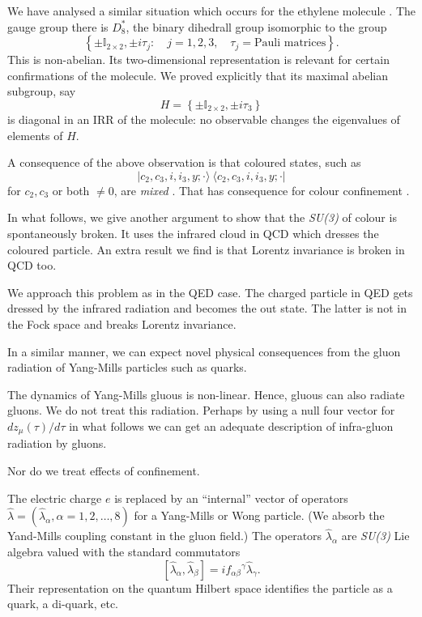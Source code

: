 We have analysed a similar situation which occurs for the ethylene molecule \cite{key10}. The gauge group there is $D^\ast_8$, the binary dihedrall group isomorphic to the group
\begin{equation}
\left\{ \pm \mathbb{I}_{2 \times 2}, \pm i \tau_j :\quad j=1, 2, 3, \quad \tau_j = \text{Pauli matrices}\right\}.\label{chap1-eq3.2}
\end{equation}
This is non-abelian. Its two-dimensional representation is relevant for certain confirmations of the molecule. We proved explicitly that its maximal abelian subgroup, say
\begin{equation}
H = \left\{ \pm \mathbb{I}_{2 \times 2}, \pm  i \tau_3\right\}\label{chap1-eq3.3}
\end{equation}
is diagonal in an IRR of the molecule: no observable changes the eigenvalues of elements of $H$.

A consequence of the above observation is that coloured states, such as
\begin{equation}
|c_2, c_3, i, i_3, y; \cdot \rangle ~ \langle c_2, c_3, i, i_3, y; \cdot | \label{chap1-eq3.4}
\end{equation}
for $c_2, c_3$ or both $\neq 0$, are \textit{mixed} \cite{key4}. That has consequence for colour confinement \cite{key4}.

In what follows, we give another argument to show that the \textit{SU(3)} of colour is spontaneously broken. It uses the infrared cloud in QCD which dresses the coloured particle. An extra result we find is that Lorentz invariance is broken in QCD too.

We approach this problem as in the QED case. The charged particle in QED gets dressed by the infrared radiation and becomes the out state. The latter is not in the Fock space and breaks Lorentz invariance.

In a similar manner, we can expect novel physical consequences from the gluon radiation of Yang-Mills particles such as quarks.

The dynamics of Yang-Mills gluous is non-linear. Hence, gluous can also radiate gluons. We do not treat this radiation. Perhaps by using a null four vector for $dz_\mu (\tau)/d \tau $ in what follows we can get an adequate description of infra-gluon radiation by gluons.

Nor do we treat effects of confinement.

The electric charge $e$ is replaced by an ``internal'' vector of operators $\hat{\lambda}= (\hat{\lambda}_\alpha, \alpha = 1, 2, \ldots , 8)$ for a Yang-Mills or Wong \cite{key11} particle. (We absorb the Yand-Mills coupling constant in the gluon field.) The operators $\hat{\lambda}_{\alpha}$ are \textit{SU(3)} Lie algebra valued with the standard commutators
\begin{equation}
\left[ \hat{\lambda}_\alpha, \hat{\lambda}_\beta \right] = if_{\alpha \beta} {}^\gamma \hat{\lambda}_\gamma. \label{chap1-eq3.5}
\end{equation}
Their representation on the quantum Hilbert space identifies the particle as a quark, a di-quark, etc.

